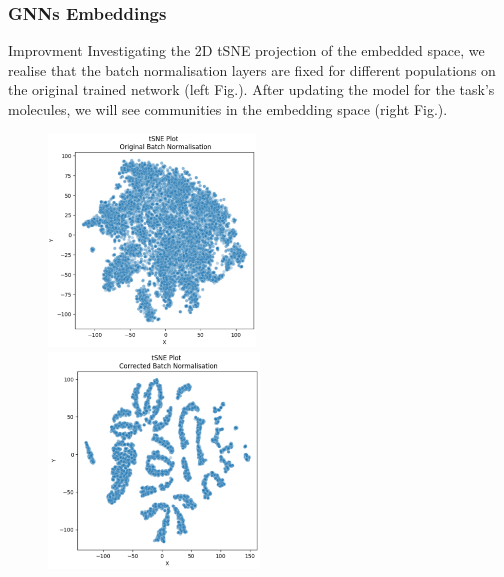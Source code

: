 \documentclass[usenames,dvipsnames]{beamer}
\begin{document}
\begin{frame}
	\frametitle{GNNs Embeddings}
	\begin{block}{Improvment}
		Investigating the 2D tSNE projection of the embedded space, we realise that the batch normalisation layers are fixed for different populations on the original trained network (left Fig.). After updating the model for the task's molecules, we will see communities in the embedding space (right Fig.).
	\end{block}
	
	\begin{figure}
		\includegraphics[width=0.49\textwidth]{original_bn}
		\includegraphics[width=0.5\textwidth]{bn}		
	\end{figure}
\end{frame}
\end{document}
